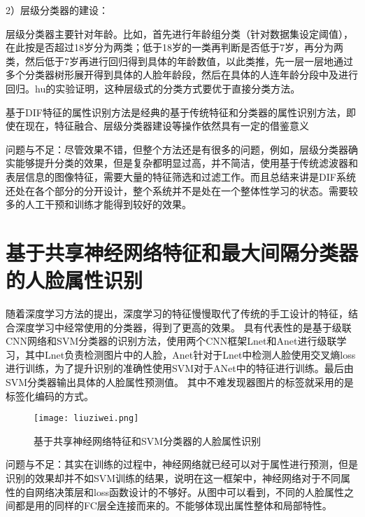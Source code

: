 2）层级分类器的建设：

层级分类器主要针对年龄。比如，首先进行年龄组分类（针对数据集设定阈值），在此按是否超过18岁分为两类；低于18岁的一类再判断是否低于7岁，再分为两类，然后低于7岁再进行回归得到具体的年龄数值，以此类推，先一层一层地通过多个分类器树形展开得到具体的人脸年龄段，然后在具体的人连年龄分段中及进行回归。hu的实验证明，这种层级式的分类方式要优于直接分类方法。

基于DIF特征的属性识别方法是经典的基于传统特征和分类器的属性识别方法，即使在现在，特征融合、层级分类器建设等操作依然具有一定的借鉴意义

问题与不足：尽管效果不错，但整个方法还是有很多的问题，例如，层级分类器确实能够提升分类的效果，但是复杂都明显过高，并不简洁，使用基于传统滤波器和表层信息的图像特征，需要大量的特征筛选和过滤工作。而且总结来讲是DIF系统还处在各个部分的分开设计，整个系统并不是处在一个整体性学习的状态。需要较多的人工干预和训练才能得到较好的效果。
\section{基于共享神经网络特征和最大间隔分类器的人脸属性识别}
随着深度学习方法的提出，深度学习的特征慢慢取代了传统的手工设计的特征，结合深度学习中经常使用的分类器，得到了更高的效果。
具有代表性的是基于级联CNN网络和SVM分类器的识别方法，使用两个CNN框架Lnet和Anet进行级联学习，其中Lnet负责检测图片中的人脸，Anet针对于Lnet中检测人脸使用交叉熵loss进行训练，为了提升识别的准确性使用SVM对于ANet中的特征进行训练。最后由SVM分类器输出具体的人脸属性预测值。
其中不难发现器图片的标签就采用的是标签化编码的方式。
\begin{figure}[!ht]
 \centering
	\texttt{[image: liuziwei.png]}
	\caption{基于共享神经网络特征和SVM分类器的人脸属性识别}
\end{figure}

问题与不足：其实在训练的过程中，神经网络就已经可以对于属性进行预测，但是识别的效果却并不如SVM训练的结果，说明在这一框架中，神经网络对于不同属性的自网络决策层和loss函数设计的不够好。从图中可以看到，不同的人脸属性之间都是用的同样的FC层全连接而来的。不能够体现出属性整体和局部特性。
